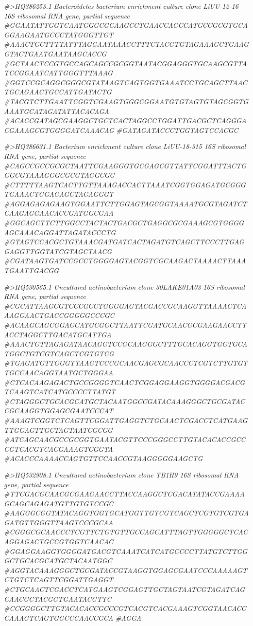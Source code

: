 \documentclass[]{article}
\newenvironment{Shaded}{\begin{snugshade}}{\end{snugshade}}
\newcommand{\CommentTok}[1]{\textcolor[rgb]{0.56,0.35,0.01}{\textit{#1}}}
\begin{document}
\begin{Shaded}
\begin{Highlighting}[]
\CommentTok{#>HQ386253.1 Bacteroidetes bacterium enrichment culture clone LiUU-12-16 16S ribosomal RNA gene, partial sequence}
\CommentTok{#GGAATATTGGTCAATGGGCGCAAGCCTGAACCAGCCATGCCGCGTGCAGGAAGAATGCCCTATGGGTTGT}
\CommentTok{#AAACTGCTTTTATTTAGGAATAAACCTTTCTACGTGTAGAAAGCTGAAGGTACTGAATGAATAAGCACCG}
\CommentTok{#GCTAACTCCGTGCCAGCAGCCGCGGTAATACGGAGGGTGCAAGCGTTATCCGGAATCATTGGGTTTAAAG}
\CommentTok{#GGTCCGCAGGCGGGCGTATAAGTCAGTGGTGAAATCCTGCAGCTTAACTGCAGAACTGCCATTGATACTG}
\CommentTok{#TACGTCTTGAATTCGGTCGAAGTGGGCGGAATGTGTAGTGTAGCGGTGAAATGCATAGATATTACACAGA}
\CommentTok{#ACACCGATAGCGAAGGCTGCTCACTAGGCCTGGATTGACGCTCAGGGACGAAAGCGTGGGGATCAAACAG}
\CommentTok{#GATAGATACCCTGGTAGTCCACGC}

\CommentTok{#>HQ386631.1 Bacterium enrichment culture clone LiUU-18-315 16S ribosomal RNA gene, partial sequence}
\CommentTok{#CAGCCGCCGCGCTAATTCGAAGGGTGCGAGCGTTATTCGGATTTACTGGGCGTAAAGGGCGCGTAGGCGG}
\CommentTok{#CTTTTTAAGTCACTTGTTAAAGACCACTTAAATCGGTGGAGATGCGGGTGAAACTGGAGAGCTAGAGGGT}
\CommentTok{#AGGAGAGAGAAGTGGAATTCTTGGAGTAGCGGTAAAATGCGTAGATCTCAAGAGGAACACCGATGGCGAA}
\CommentTok{#GGCAGCTTCTTGGCCTACTACTGACGCTGAGGCGCGAAAGCGTGGGGAGCAAACAGGATTAGATACCCTG}
\CommentTok{#GTAGTCCACGCTGTAAACGATGATCACTAGATGTCAGCTTCCCTTGAGGAGGTTGGTATCGTAGCTAACG}
\CommentTok{#CGATAAGTGATCCGCCTGGGGAGTACGGTCGCAAGACTAAAACTTAAATGAATTGACGG}

\CommentTok{#>HQ530565.1 Uncultured actinobacterium clone 30LAKE01A03 16S ribosomal RNA gene, partial sequence}
\CommentTok{#CGCATTAAGCGTCCCGCCTGGGGAGTACGACCGCAAGGTTAAAACTCAAAGGAACTGACCGGGGGCCCGC}
\CommentTok{#ACAAGCAGCGGAGCATGCGGCTTAATTCGATGCAACGCGAAGAACCTTACCTAGGCTTGACATGCATTGA}
\CommentTok{#AAACTGTTAGAGATAACAGGTCCGCAAGGGCTTTGCACAGGTGGTGCATGGCTGTCGTCAGCTCGTGTCG}
\CommentTok{#TGAGATGTTGGGTTAAGTCCCGCAACGAGCGCAACCCTCGTCTTGTGTTGCCAACAGGTAATGCTGGGAA}
\CommentTok{#CTCACAAGAGACTGCCGGGGTCAACTCGGAGGAAGGTGGGGACGACGTCAAGTCATCATGCCCCTTATGT}
\CommentTok{#CTAGGGCTGCACGCATGCTACAATGGCCGATACAAAGGGCTGCGATACCGCAAGGTGGAGCGAATCCCAT}
\CommentTok{#AAAGTCGGTCTCAGTTCGGATTGAGGTCTGCAACTCGACCTCATGAAGTTGGAGTTGCTAGTAATCGCGG}
\CommentTok{#ATCAGCAACGCCGCGGTGAATACGTTCCCGGGCCTTGTACACACCGCCCGTCACGTCACGAAAGTCGGTA}
\CommentTok{#ACACCCAAAACCAGTGTTCCAACCGTAAGGGGGAAGCTG}

\CommentTok{#>HQ532908.1 Uncultured actinobacterium clone TB1H9 16S ribosomal RNA gene, partial sequence}
\CommentTok{#TTCGACGCAACGCGAAGAACCTTACCAAGGCTCGACATATACCGAAAAGCAGCAGAGATGTTGTGTCCGC}
\CommentTok{#AAGGGCGGTATACAGGTGGTGCATGGTTGTCGTCAGCTCGTGTCGTGAGATGTTGGGTTAAGTCCCGCAA}
\CommentTok{#CGGGCGCAACCCTCGTTCTGTGTTGCCAGCATTTAGTTGGGGGCTCACAGGAGACTGCCGTGGTCAACAC}
\CommentTok{#GGAGGAAGGTGGGGATGACGTCAAATCATCATGCCCCTTATGTCTTGGGCTGCACGCATGCTACAATGGC}
\CommentTok{#AGGTACAAAGGGCTGCGATACCGTAAGGTGGAGCGAATCCCAAAAAGTCTGTCTCAGTTCGGATTGAGGT}
\CommentTok{#CTGCAACTCGACCTCATGAAGTCGGAGTTGCTAGTAATCGTAGATCAGCAACGCTACGGTGAATACGTTC}
\CommentTok{#CCGGGGCTTGTACACACCGCCCGTCACGTCACGAAAGTCGGTAACACCCAAAGTCAGTGGCCCAACCGCA}
\CommentTok{#AGGA}


\end{Highlighting}
\end{Shaded}
\end{document}
